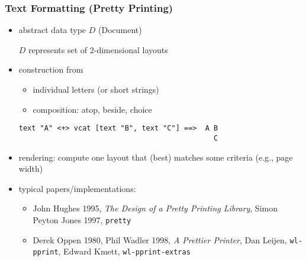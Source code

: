 
\begin{frame}[fragile]
\frametitle{Text Formatting (Pretty Printing)}

\begin{itemize}[<+->]
\item 
abstract data type $D$ (Document)

$D$ represents set of 2-dimensional layouts
\item
construction from
  \begin{itemize}[]
  \item individual letters (or short strings)
  \item composition: atop, beside, choice
  \end{itemize}
\begin{small}
\begin{verbatim}
text "A" <+> vcat [text "B", text "C"] ==>  A B
                                              C
\end{verbatim}
\end{small}
\item 
  rendering: compute one layout that (best) matches
  some criteria (e.g., page width)
\item
typical papers/implementations:
\begin{itemize}
\item 
John Hughes 1995, 
\emph{The Design of a Pretty Printing Library},
Simon Peyton Jones 1997, \texttt{pretty}
\item
Derek Oppen 1980, Phil Wadler 1998,
\emph{A Prettier Printer}, Dan Leijen, \texttt{wl-pprint},
Edward Kmett, \texttt{wl-pprint-extras}
\end{itemize}


\end{itemize}


\end{frame}
